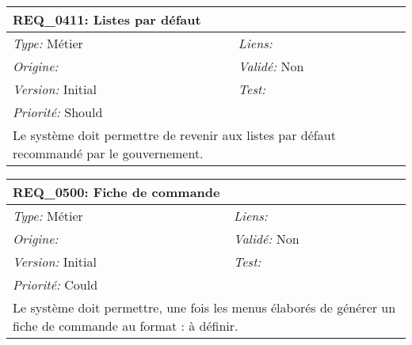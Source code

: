 \begin{table}[!h]

\begin{tabular}{|p{60mm}p{100mm}|}

\hline

\multicolumn{2}{|l|}{\textbf{REQ\_0411:} Listes par défaut} \\ \hline

\emph{Type:} Métier & \emph{Liens:}  \\

\emph{Origine:}  & \emph{Validé:} Non \\

\emph{Version:} Initial & \emph{Test:}  \\

\emph{Priorité:} Should & \\ \hline

\multicolumn{2}{|p{16cm}|}{Le système doit permettre de revenir aux listes par défaut recommandé par le gouvernement.} \\ \hline

\end{tabular}

\end{table}



\begin{table}[!h]

\begin{tabular}{|p{60mm}p{100mm}|}

\hline

\multicolumn{2}{|l|}{\textbf{REQ\_0500:} Fiche de commande} \\ \hline

\emph{Type:} Métier & \emph{Liens:}  \\

\emph{Origine:}  & \emph{Validé:} Non \\

\emph{Version:} Initial & \emph{Test:}  \\

\emph{Priorité:} Could & \\ \hline

\multicolumn{2}{|p{16cm}|}{Le système doit permettre, une fois les menus élaborés de générer un fiche de commande au format : à définir.} \\ \hline

\end{tabular}

\end{table}



